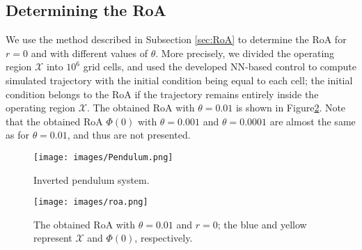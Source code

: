 \documentclass[1p,times]{elsarticle}
\begin{document}




\subsection{Determining the RoA}
{{\color{blue}}We use the method described in Subsection \ref{sec:RoA} to determine the RoA for $r=0$ and with different values of $\theta$. More precisely, we divided the operating region $\mathcal{X}$ into $10^6$ grid cells, and used the developed NN-based control to compute simulated trajectory with the initial condition being equal to each cell; the initial condition belongs to the RoA if the trajectory remains entirely inside the operating region $\mathcal{X}$.} The obtained RoA with $\theta=0.01$ is shown in Figure\ref{fig:ROAPendulum}. Note that the obtained RoA $\Phi(0)$ with $\theta=0.001$ and $\theta=0.0001$ are almost the same as for $\theta=0.01$, and thus are not presented.


\begin{figure}[!t]
    \centering
    \texttt{[image: images/Pendulum.png]}
    \caption{{{\color{blue}}Inverted pendulum system.}}
    \label{fig:InvertedPendulum}
\end{figure}

\begin{figure}[!t]
    \centering
    \texttt{[image: images/roa.png]}
    \caption{{{\color{blue}}The obtained RoA with $\theta=0.01$ and $r=0$; the blue and yellow represent $\mathcal{X}$ and $\Phi(0)$, respectively.}}
    \label{fig:ROAPendulum}
\end{figure}
\end{document}
